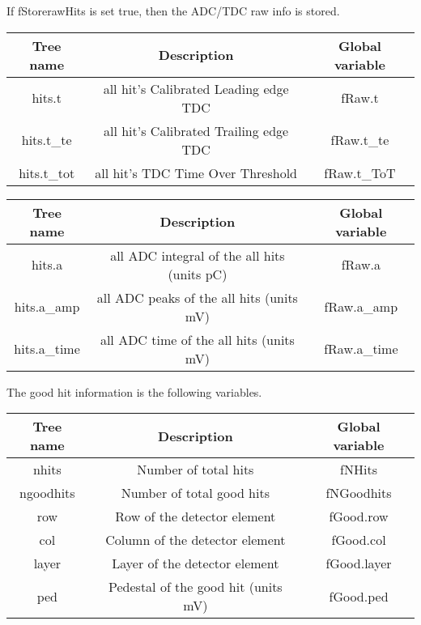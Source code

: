 \documentclass[11pt]{article}
\begin{document}
If fStorerawHits is set true, then the ADC/TDC raw info is stored.

\begin{center}
\begin{tabular}{|c|c|c|}
	\hline 
	Tree name	& Description &  Global variable\\ 
	\hline 
	hits.t 	&  all hit's Calibrated Leading edge TDC  &fRaw.t  \\ 
	\hline 
	hits.t\_te 	& all hit's  Calibrated Trailing edge TDC &fRaw.t\_te  \\ 
	\hline 
	hits.t\_tot	&  all hit's TDC Time Over Threshold   &fRaw.t\_ToT  \\ 
	\hline 
\end{tabular} 
\end{center}
\begin{center}
	\begin{tabular}{|c|c|c|}
		\hline 
		Tree name	& Description &  Global variable\\ 
		\hline 
		hits.a 	&  all ADC integral of the all hits  (units pC)  &fRaw.a  \\ 
		\hline 
		hits.a\_amp 	&  all ADC peaks of the all hits  (units mV)  &fRaw.a\_amp  \\ 
		\hline 
		hits.a\_time	&  all ADC time of the all hits (units mV)  &fRaw.a\_time  \\ 
		\hline 
	\end{tabular} 
\end{center}

The good hit information is the following variables.

\begin{center}
\begin{tabular}{|c|c|c|}
	\hline 
Tree name	& Description &  Global variable\\ 
	\hline 
nhits	& Number of total hits & fNHits  \\ 
	\hline 
ngoodhits	& Number of total good hits & fNGoodhits \\ 
	\hline 
row 	& Row of the detector element  & fGood.row  \\ 
	\hline 
col 	& Column of the detector element  & fGood.col \\
	\hline 
layer	& Layer of the detector element  & fGood.layer \\ 
	\hline 
ped	& Pedestal of the good hit (units mV) & fGood.ped \\ 
	\hline 
\end{tabular} 
\end{center}
\end{document}
